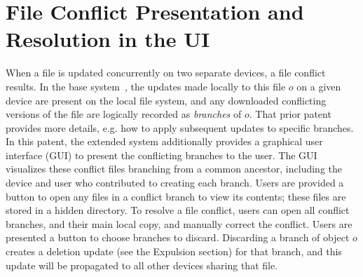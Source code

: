 \section*{File Conflict Presentation and Resolution in the UI}

When a file is updated concurrently on two separate devices, a file conflict
results. In the base system~\cite{wang:patent2012}, the updates made locally to
this file $o$ on a given device are present on the local file system, and any
downloaded conflicting versions of the file are logically recorded as {\em
branches} of $o$. That prior patent provides more details, e.g. how to apply
subsequent updates to specific branches. In this patent, the extended system
additionally provides a graphical user interface (GUI) to present the
conflicting branches to the user. The GUI visualizes these conflict files
branching from a common ancestor, including the device and user who contributed
to creating each branch. Users are provided a button to open any files in a
conflict branch to view its contents; these files are stored in a hidden
directory. To resolve a file conflict, users can open all conflict branches, and
their main local copy, and manually correct the conflict. Users are presented a
button to choose branches to discard. Discarding a branch of object $o$ creates
a deletion update (see the Expulsion section) for that branch, and this update
will be propagated to all other devices sharing that file.
